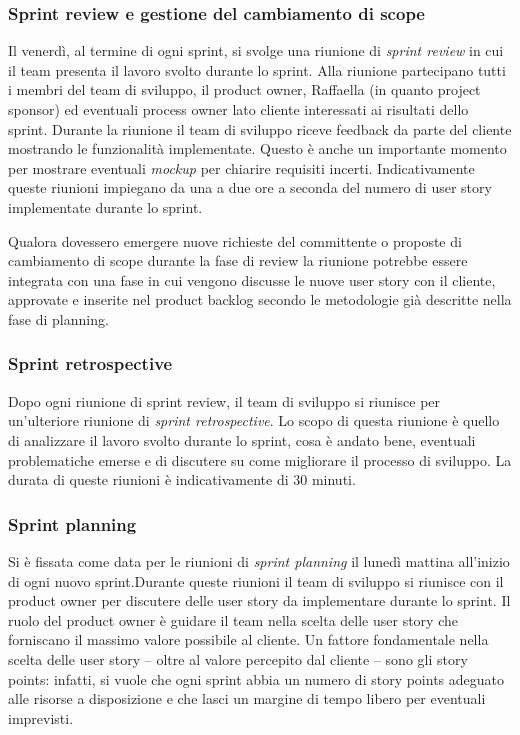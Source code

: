 \subsubsection{Sprint review e gestione del cambiamento di scope}
Il venerdì, al termine di ogni sprint, si svolge una riunione di \emph{sprint review} in cui il team presenta il lavoro svolto durante lo sprint. Alla riunione partecipano tutti i membri del team di sviluppo, il product owner, Raffaella (in quanto project sponsor) ed eventuali process owner lato cliente interessati ai risultati dello sprint.
Durante la riunione il team di sviluppo riceve feedback da parte del cliente mostrando le funzionalità implementate. Questo è anche un importante momento per mostrare eventuali \emph{mockup} per chiarire requisiti incerti.
Indicativamente queste riunioni impiegano da una a due ore a seconda del numero di user story implementate durante lo sprint.

Qualora dovessero emergere nuove richieste del committente o proposte di cambiamento di scope durante la fase di review la riunione potrebbe essere integrata con una fase in cui vengono discusse le nuove user story con il cliente, approvate e inserite nel product backlog secondo le metodologie già descritte nella fase di planning.

\subsubsection{Sprint retrospective}
Dopo ogni riunione di sprint review, il team di sviluppo si riunisce per un'ulteriore riunione di \emph{sprint retrospective}. Lo scopo di questa riunione è quello di analizzare il lavoro svolto durante lo sprint, cosa è andato bene, eventuali problematiche emerse e di discutere su come migliorare il processo di sviluppo. 
La durata di queste riunioni è indicativamente di 30 minuti.

\subsubsection{Sprint planning}
Si è fissata come data per le riunioni di \emph{sprint planning} il lunedì mattina all'inizio di ogni nuovo sprint.Durante queste riunioni il team di sviluppo si riunisce con il product owner per discutere delle user story da implementare durante lo sprint. Il ruolo del product owner è guidare il team nella scelta delle user story che forniscano il massimo valore possibile al cliente. Un fattore fondamentale nella scelta delle user story -- oltre al valore percepito dal cliente -- sono gli story points: infatti, si vuole che ogni sprint abbia un numero di story points adeguato alle risorse a disposizione e che lasci un margine di tempo libero per eventuali imprevisti.

